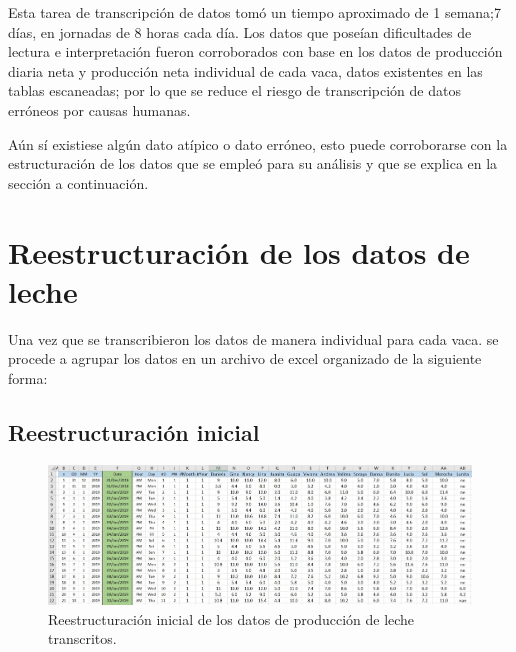 Esta tarea de transcripción de datos tomó un tiempo aproximado de 1 semana;7 días, en jornadas de 8 horas cada día. Los datos que poseían dificultades de lectura e interpretación fueron corroborados con base en los datos de producción diaria neta y producción neta individual de cada vaca, datos existentes en las tablas escaneadas; por lo que se reduce el riesgo de transcripción de datos erróneos por causas humanas.

Aún sí existiese algún dato atípico o dato erróneo, esto puede corroborarse con la estructuración de los datos que se empleó para su análisis y que se explica en la sección a continuación.

\section{Reestructuración de los datos de leche}\label{reestructleche}
Una vez que se transcribieron los datos de manera individual para cada vaca. se procede a agrupar los datos en un archivo de excel organizado de la siguiente forma:

\subsection{Reestructuración inicial}

\begin{figure}[H]
	 \begin{center}
	 \includegraphics[scale=0.335]{img/dfinicial.jpg}
	 \end{center}
	 \caption{Reestructuración inicial de los datos de producción de leche transcritos. \label{dfinicialpng}}
\end{figure}

